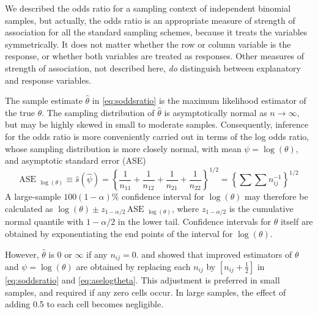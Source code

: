 We described the odds ratio for a sampling context of independent binomial
samples, but actually, the odds ratio is an appropriate measure of strength
of association for all the standard sampling schemes, because it treats
the variables symmetrically.  It does not matter whether the row or column
variable is the response, or whether both variables are treated as
responses.  Other measures of strength of association, not described here,
\emph{do} distinguish between explanatory and response variables.

The sample estimate $\hat{\theta}$ in \eqref{eq:soddsratio} is the
maximum likelihood estimator of the true $\theta$.
The sampling distribution of $\hat{\theta}$ is asymptotically normal
as $n \rightarrow \infty$, but may be highly skewed in small to
moderate samples.  Consequently, inference for the odds ratio
is more conveniently carried out in terms of the log odds ratio,
whose sampling distribution is more closely normal, with mean
$\psi = \log (\theta)$, and asymptotic standard error (ASE)
\begin{equation}\label{eq:aselogtheta}
 \mbox{ASE }_{\log (\theta)} \equiv \hat{s} (\hat{\psi} ) =
 {\left\{
 \frac{1}{n_{11}} + \frac{1}{n_{12}} + \frac{1}{n_{21}} + \frac{1}{n_{22}}
 \right \} }^{1/2}
 =   {\left\{ \sum \sum n_{ij}^{-1} \right \} }^{1/2}
\end{equation}
A large-sample $100(1-\alpha)$\% confidence interval for $\log (\theta)$ may therefore
be calculated as $\log (\theta) \pm z_{1-\alpha/2} \, \mbox{ASE }_{\log (\theta)}$,
where $z_{ 1 - \alpha  / 2 }$ is the cumulative normal quantile with
$1-\alpha/2$ in the lower tail.
Confidence intervals for $\theta$ itself are obtained by exponentiating
the end points of the interval for $\log (\theta)$.

However, $\hat{\theta}$ is 0 or $\infty$ if any $n_{ij}=0$.
\citet{Haldane:55} and \citet{GartZweiful:67} showed that improved
estimators of $\theta$ and $\psi = \log (\theta)$ are obtained by
replacing each $n_{ij}$ by $[n_{ij} + \frac{1}{2}]$ in \eqref{eq:soddsratio}
and \eqref{eq:aselogtheta}.
This adjustment is preferred in small samples, and required if any
zero cells occur.  In large samples, the effect of adding 0.5 to each
cell becomes negligible.



